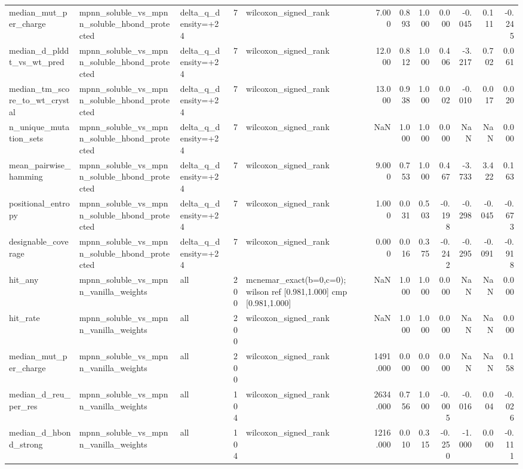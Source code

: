 \begin{table}
{\begin{tabular}{lllrlrrrrrrr}
median\_mut\_per\_charge & mpnn\_soluble\_vs\_mpnn\_soluble\_hbond\_protected & delta\_q\_density=+24 & 7 & wilcoxon\_signed\_rank & 7.000 & 0.893 & 1.000 & 0.000 & -0.045 & 0.111 & -0.245 \\
median\_d\_plddt\_vs\_wt\_pred & mpnn\_soluble\_vs\_mpnn\_soluble\_hbond\_protected & delta\_q\_density=+24 & 7 & wilcoxon\_signed\_rank & 12.000 & 0.812 & 1.000 & 0.406 & -3.217 & 0.702 & 0.061 \\
median\_tm\_score\_to\_wt\_crystal & mpnn\_soluble\_vs\_mpnn\_soluble\_hbond\_protected & delta\_q\_density=+24 & 7 & wilcoxon\_signed\_rank & 13.000 & 0.938 & 1.000 & 0.002 & -0.010 & 0.017 & 0.020 \\
n\_unique\_mutation\_sets & mpnn\_soluble\_vs\_mpnn\_soluble\_hbond\_protected & delta\_q\_density=+24 & 7 & wilcoxon\_signed\_rank & NaN & 1.000 & 1.000 & 0.000 & NaN & NaN & 0.000 \\
mean\_pairwise\_hamming & mpnn\_soluble\_vs\_mpnn\_soluble\_hbond\_protected & delta\_q\_density=+24 & 7 & wilcoxon\_signed\_rank & 9.000 & 0.753 & 1.000 & 0.467 & -3.733 & 3.422 & 0.163 \\
positional\_entropy & mpnn\_soluble\_vs\_mpnn\_soluble\_hbond\_protected & delta\_q\_density=+24 & 7 & wilcoxon\_signed\_rank & 1.000 & 0.031 & 0.503 & -0.198 & -0.298 & -0.045 & -0.673 \\
designable\_coverage & mpnn\_soluble\_vs\_mpnn\_soluble\_hbond\_protected & delta\_q\_density=+24 & 7 & wilcoxon\_signed\_rank & 0.000 & 0.016 & 0.375 & -0.242 & -0.295 & -0.091 & -0.918 \\
hit\_any & mpnn\_soluble\_vs\_mpnn\_vanilla\_weights & all & 200 & mcnemar\_exact(b=0,c=0); wilson ref [0.981,1.000] cmp [0.981,1.000] & NaN & 1.000 & 1.000 & 0.000 & NaN & NaN & 0.000 \\
hit\_rate & mpnn\_soluble\_vs\_mpnn\_vanilla\_weights & all & 200 & wilcoxon\_signed\_rank & NaN & 1.000 & 1.000 & 0.000 & NaN & NaN & 0.000 \\
median\_mut\_per\_charge & mpnn\_soluble\_vs\_mpnn\_vanilla\_weights & all & 200 & wilcoxon\_signed\_rank & 1491.000 & 0.000 & 0.000 & 0.000 & NaN & NaN & 0.158 \\
median\_d\_reu\_per\_res & mpnn\_soluble\_vs\_mpnn\_vanilla\_weights & all & 104 & wilcoxon\_signed\_rank & 2634.000 & 0.756 & 1.000 & -0.005 & -0.016 & 0.004 & -0.026 \\
median\_d\_hbond\_strong & mpnn\_soluble\_vs\_mpnn\_vanilla\_weights & all & 104 & wilcoxon\_signed\_rank & 1216.000 & 0.010 & 0.315 & -0.250 & -1.000 & 0.000 & -0.111 \\

\end{tabular}}
\end{table}
